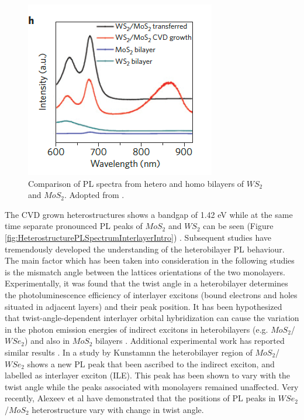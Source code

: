 \begin{figure}[H]
	\begin{center}
		\includegraphics[scale=1]{Heterostructures/HeterostructurePLSpectrumIntroComparison.png}
		\caption{Comparison of PL spectra from hetero and homo bilayers of $WS_2$ and $MoS_2$. Adopted from \cite{Gong2014}.}
		\label{fig:HeterostructurePLSpectrumIntroComparison}
	\end{center}
\end{figure}

The CVD grown heterostructures shows a bandgap of 1.42 eV while at the same time separate pronounced PL peaks of $MoS_2$ and $WS_2$ can be seen (Figure \ref{fig:HeterostructurePLSpectrumInterlayerIntro}) \cite{Gong2014}. Subsequent studies have tremendously developed the understanding of the heterobilayer PL behaviour. The main factor which has been taken into consideration in the following studies is the mismatch angle between the lattices orientations of the two monolayers. Experimentally, it was found that the twist angle in a heterobilayer determines the photoluminescence efficiency of interlayer excitons (bound  electrons and holes situated in adjacent layers) and their peak position. It has been hypothesized that twist-angle-dependent interlayer orbital hybridization can cause the variation in the photon emission energies of indirect excitons in heterobilayers (e.g. $MoS_2$/$WSe_2$) and also in $MoS_2$ bilayers \cite{Nayak2017}. Additional experimental work has reported similar results \cite{Heo2015}\cite{Liu2014a}. In a study by Kunstamnn \cite{Kunstmann2018} the heterobilayer region of $MoS_2$/$WSe_2$ shows a new PL peak that been ascribed to the indirect exciton, and labelled as interlayer exciton (ILE). This peak has been shown to vary with the twist angle while the peaks associated with monolayers remained unaffected. Very recently, Alexeev et al \cite{Alexeev2019} have demonstrated that the positions of PL peaks in $WSe_2$/$MoS_2$ heterostructure vary with change in twist angle.